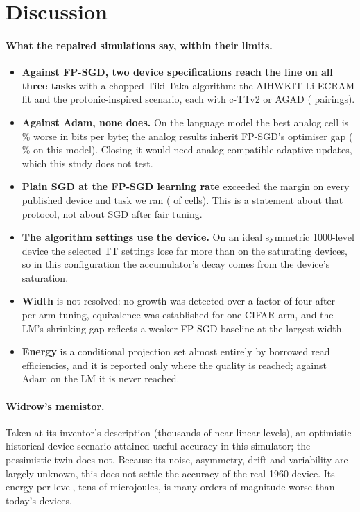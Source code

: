 \section{Discussion}\label{sec:discussion}
\paragraph{What the repaired simulations say, within their limits.}
\begin{itemize}
\item \textbf{Against FP-SGD, two device specifications reach the line on all three tasks} with a chopped Tiki-Taka algorithm:
      the AIHWKIT Li-ECRAM fit and the protonic-inspired scenario, each with c-TTv2 or AGAD (\RVAllThreeFpN{} pairings).
\item \textbf{Against Adam, none does.} On the language model the best analog cell is \RVLmAdamBestGap\,\% worse in bits per
      byte; the analog results inherit FP-SGD's optimiser gap (\RVLmFpSgdVsAdamPct\,\% on this model). Closing it would need
      analog-compatible adaptive updates, which this study does not test.
\item \textbf{Plain SGD at the FP-SGD learning rate} exceeded the margin on every published device and task we ran
      (\RVSgdPubFail{} of \RVSgdPubN{} cells). This is a statement about that protocol, not about SGD after fair tuning.
\item \textbf{The algorithm settings use the device.} On an ideal symmetric 1000-level device the selected TT settings lose
      far more than on the saturating devices, so in this configuration the accumulator's decay comes from the device's
      saturation.
\item \textbf{Width} is not resolved: no growth was detected over a factor of four after per-arm tuning, equivalence was
      established for one CIFAR arm, and the LM's shrinking gap reflects a weaker FP-SGD baseline at the largest width.
\item \textbf{Energy} is a conditional projection set almost entirely by borrowed read efficiencies, and it is reported only
      where the quality is reached; against Adam on the LM it is never reached.
\end{itemize}

\paragraph{Widrow's memistor.} Taken at its inventor's description (thousands of near-linear levels), an optimistic
historical-device scenario attained useful accuracy in this simulator; the pessimistic twin does not. Because its noise,
asymmetry, drift and variability are largely unknown, this does not settle the accuracy of the real 1960 device. Its energy per
level, tens of microjoules, is many orders of magnitude worse than today's devices.

